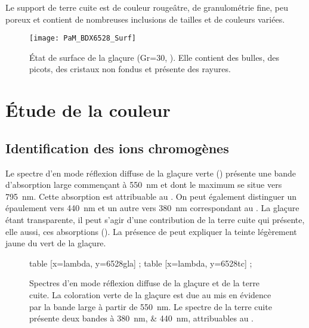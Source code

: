 Le support de terre cuite est de couleur rougeâtre, de granulométrie 
fine, peu poreux et contient de nombreuses inclusions de tailles et 
de couleurs variées.

\begin{figure}[htb]
  \texttt{[image: PaM\_BDX6528\_Surf]}
  \caption[\ -- État de surface de la glaçure]
          {\legendeA 
           État de surface de la glaçure (Gr=30, ). Elle contient des 
           bulles, des picots, des cristaux non fondus et présente 
           des rayures.}
  \label{surf:6528}
\end{figure}


\section{Étude de la couleur}

\subsection{Identification des ions chromogènes}
Le spectre d'\AO en mode réflexion diffuse de la glaçure verte () présente une bande d'absorption large commençant à \SI{550}{nm} et dont le maximum se situe vers \SI{795}{nm}. Cette absorption est attribuable au  \autocite{Lajarte_1979}. On peut également distinguer un épaulement vers \SI{440}{nm} et un autre vers \SI{380}{nm} correspondant au . La glaçure étant transparente, il peut s'agir d'une contribution de la terre cuite qui présente, elle aussi, ces absorptions (). La présence de  peut expliquer la teinte légèrement jaune du vert de la glaçure.

\begin{figure}[htb]
  \begin{plotspectre}
       table [x=lambda, y=6528gla] {\gladata} ;
       table [x=lambda, y=6528tc] {\tcdata} ;
  \end{plotspectre}
  \caption[\ -- Spectres d'\AO en mode réflexion diffuse de la glaçure et de la terre cuite]
          {\legendeA
           Spectres d'\AO en mode réflexion diffuse de la glaçure et de la terre cuite. La coloration verte de la glaçure est due au  mis en évidence par la bande large à partir de \SI{550}{\nm}. Le spectre de la terre cuite présente deux bandes à \SIlist{380;440}{\nm}, attribuables au  \autocite{Lajarte_1979}.}
  \label{spectre:6528}
\end{figure}


